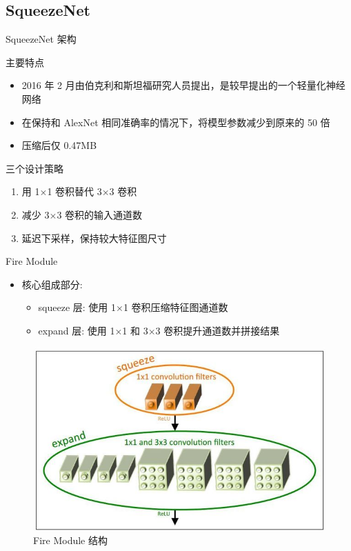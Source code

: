 \documentclass{beamer}
\begin{document}
\subsection{SqueezeNet}
\begin{frame}{SqueezeNet 架构}
    \begin{block}{主要特点}
        \begin{itemize}
            \item 2016 年 2 月由伯克利和斯坦福研究人员提出，是较早提出的一个轻量化神经网络
            \item 在保持和 AlexNet 相同准确率的情况下，将模型参数减少到原来的 50 倍
            \item 压缩后仅 0.47MB
        \end{itemize}
    \end{block}
    \begin{block}{三个设计策略}
        \begin{enumerate}
            \item 用 1$\times$1 卷积替代 3$\times$3 卷积
            \item 减少 3$\times$3 卷积的输入通道数
            \item 延迟下采样，保持较大特征图尺寸
        \end{enumerate}
    \end{block}
\end{frame}

\begin{frame}{Fire Module}
    \begin{itemize}
        \item 核心组成部分:
        \begin{itemize}
            \item squeeze 层: 使用 1$\times$1 卷积压缩特征图通道数
            \item expand 层: 使用 1$\times$1 和 3$\times$3 卷积提升通道数并拼接结果
        \end{itemize}
    \end{itemize}
    \begin{figure}
        \centering
        \includegraphics[width=0.7\linewidth]{pic/fire_module.jpg}
        \caption{Fire Module 结构}
    \end{figure}
\end{frame}
\end{document}
